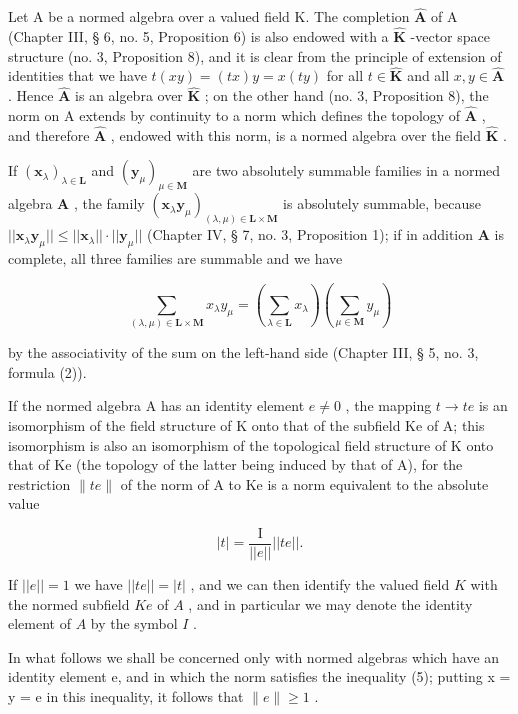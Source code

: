 Let A be a normed algebra over a valued field K. The completion \(\hat{\mathbf{A}}\) of A (Chapter III, § 6, no. 5, Proposition 6) is also endowed with a \(\hat{\mathbf{K}}\) -vector space structure (no. 3, Proposition 8), and it is clear from the principle of extension of identities that we have \(t(xy) = (tx)y = x(ty)\) for all \(t \in \hat{\mathbf{K}}\) and all \(x, y \in \hat{\mathbf{A}}\) . Hence \(\hat{\mathbf{A}}\) is an algebra over \(\hat{\mathbf{K}}\) ; on the other hand (no. 3, Proposition 8), the norm on A extends by continuity to a norm which defines the topology of \(\hat{\mathbf{A}}\) , and therefore \(\hat{\mathbf{A}}\) , endowed with this norm, is a normed algebra over the field \(\hat{\mathbf{K}}\) .

If \((\pmb{x}_{\lambda})_{\lambda \in \mathbf{L}}\) and \((\pmb{y}_{\mu})_{\mu \in \mathbf{M}}\) are two absolutely summable families in a normed algebra \(\mathbf{A}\) , the family \((\pmb{x}_{\lambda}\pmb{y}_{\mu})_{(\lambda, \mu) \in \mathbf{L} \times \mathbf{M}}\) is absolutely summable, because \(||\pmb{x}_{\lambda}\pmb{y}_{\mu}|| \leqslant ||\pmb{x}_{\lambda}|| \cdot ||\pmb{y}_{\mu}||\) (Chapter IV, § 7, no. 3, Proposition 1); if in addition \(\mathbf{A}\) is complete, all three families are summable and we have

\[
\sum_ {(\lambda , \mu) \in \mathbf {L} \times \mathbf {M}} x _ {\lambda} y _ {\mu} = \left(\sum_ {\lambda \in \mathbf {L}} x _ {\lambda}\right) \left(\sum_ {\mu \in \mathbf {M}} y _ {\mu}\right)
\]

by the associativity of the sum on the left-hand side (Chapter III, § 5, no. 3, formula (2)).

If the normed algebra A has an identity element \(e \neq 0\) , the mapping \(t \rightarrow te\) is an isomorphism of the field structure of K onto that of the subfield Ke of A; this isomorphism is also an isomorphism of the topological field structure of K onto that of Ke (the topology of the latter being induced by that of A), for the restriction \(\|te\|\) of the norm of A to Ke is a norm equivalent to the absolute value

\[
| t | = \frac {\mathrm{I}}{| | e | |} | | t e | |.
\]

If \(||e|| = 1\) we have \(||te|| = |t|\) , and we can then identify the valued field \(K\) with the normed subfield \(Ke\) of \(A\) , and in particular we may denote the identity element of \(A\) by the symbol \(I\) .

In what follows we shall be concerned only with normed algebras which have an identity element e, and in which the norm satisfies the inequality (5); putting x = y = e in this inequality, it follows that \(\|e\| \geqslant 1\) .

